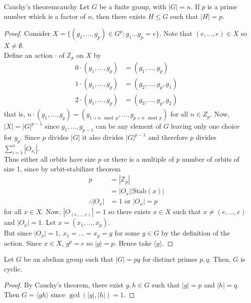\documentclass[12pt]{article}
\newcommand{\Z}{\mathbb{Z}}
\newcommand{\Stab}{\text{Stab}}
\begin{document}
	\begin{mythm}{Cauchy's theorem}{cauchy}
		Let $G$ be a finite group, with $|G|=n$. If $p$ is a prime number which is a factor of $n$, then there exists $H\leq G$ such that $|H|=p$.
		\begin{proof}
			Consider $X=\{(g_1, \dots, g_p)\in G^p:g_1\dots g_p=e\}$. Note that $(e, \dots, e)\in X$ so $X\neq\emptyset$.\\
			
			Define an action $\cdot$ of $\Z_p$ on $X$ by
			\begin{align*}
				0\cdot(g_1, \dots, g_p)&=(g_1, \dots, g_p)\\
				1\cdot(g_1, \dots, g_p)&=(g_2, \dots, g_p, g_1)\\
				2\cdot(g_1, \dots, g_p)&=(g_3, \dots, g_p, g_2)
			\end{align*}
			that is, $n\cdot(g_1, \dots, g_p)=(g_{1+n\mod p}, \dots, g_{p+n\mod p})$ for all $n\in Z_p$. Now, $|X|=|G|^{p-1}$ since $g_1, \dots, g_{p-1}$ can be any element of $G$ leaving only one choice for $g_p$. Since $p$ divides $|G|$ it also divides $|G|^{p-1}$ and therefore $p$ divides $\sum_{i=1}^n|O_{x_i}|$.\\
			
			Thus either all orbits have size $p$ or there is a multiple of $p$ number of orbits of size 1, since by orbit-stabilizer theorem
			\begin{align*}
				p&=|\Z_p|\\
				&=|O_x||\Stab(x)|\\
				\therefore |O_x|&=1\text{ or }|O_x|=p
			\end{align*}
			for all $x\in X$. Now, $|O_{(e, \dots, e)}|=1$ so there exists $x\in X$ such that $x\neq(e, \dots, e)$ and $|O_x|=1$. Let $x=(x_1, \dots, x_p)$.\\
			
			But since $|O_x|=1$, $x_1=\dots=x_p=g$ for some $g\in G$ by the definition of the action. Since $x\in X$, $g^p=e$ so $|g|=p$. Hence take $\langle g\rangle$.
		\end{proof}
	\end{mythm}
	
	\begin{mycor}{}{}
		Let $G$ be an abelian group such that $|G|=pq$ for distinct primes $p, q$. Then, $G$ is cyclic.
		\begin{proof}
			By Cauchy's theorem, there exist $g, h\in G$ such that $|g|=p$ and $|h|=q$. Then $G=\langle gh\rangle$ since $\gcd(|g|, |h|)=1$.
		\end{proof}
	\end{mycor}
	
\end{document}
